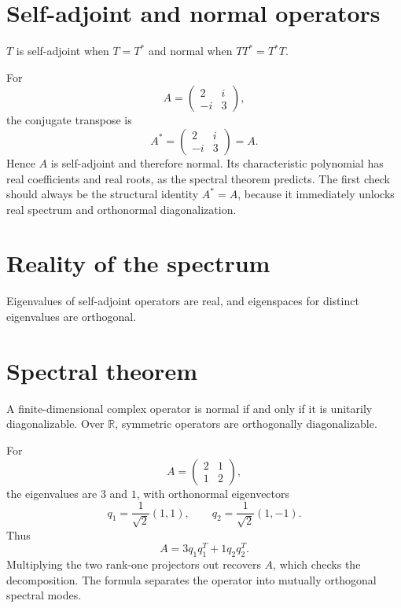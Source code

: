\section{Self-adjoint and normal operators}
$T$ is self-adjoint when $T=T^*$ and normal when $TT^*=T^*T$.


\begin{example}\label{ex:i16-expand-01}
For
\[
A=\begin{pmatrix}2&i\\-i&3\end{pmatrix},
\]
the conjugate transpose is
\[
A^*=\begin{pmatrix}2&i\\-i&3\end{pmatrix}=A.
\]
Hence \(A\) is self-adjoint and therefore normal. Its characteristic polynomial
has real coefficients and real roots, as the spectral theorem predicts.
The first check should always be the structural identity \(A^*=A\), because it
immediately unlocks real spectrum and orthonormal diagonalization.
\end{example}
\section{Reality of the spectrum}
Eigenvalues of self-adjoint operators are real, and eigenspaces for distinct eigenvalues are orthogonal.

\section{Spectral theorem}
A finite-dimensional complex operator is normal if and only if it is unitarily diagonalizable. Over $\mathbb R$, symmetric operators are orthogonally diagonalizable.


\begin{example}\label{ex:i16-expand-02}
For
\[
A=\begin{pmatrix}2&1\\1&2\end{pmatrix},
\]
the eigenvalues are \(3\) and \(1\), with orthonormal eigenvectors
\[
q_1=\frac1{\sqrt2}(1,1),\qquad q_2=\frac1{\sqrt2}(1,-1).
\]
Thus
\[
A=3q_1q_1^T+1q_2q_2^T.
\]
Multiplying the two rank-one projectors out recovers \(A\), which checks the
decomposition. The formula separates the operator into mutually orthogonal
spectral modes.
\end{example}
